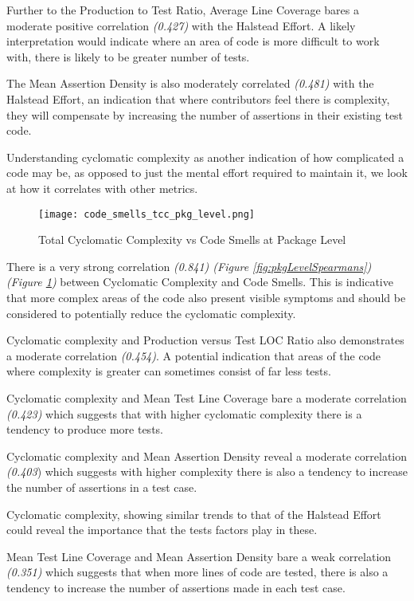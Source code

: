 Further to the Production to Test Ratio, Average Line Coverage bares a moderate positive correlation \textit{(0.427)} with the Halstead Effort. A likely interpretation would indicate where an area of code is more difficult to work with, there is likely to be greater number of tests.

The Mean Assertion Density is also moderately correlated \textit{(0.481)} with the Halstead Effort, an indication that where contributors feel there is complexity, they will compensate by increasing the number of assertions in their existing test code. 

Understanding cyclomatic complexity as another indication of how complicated a code may be, as opposed to just the mental effort required to maintain it, we look at how it correlates with other metrics.  

\begin{figure}[H]
	\texttt{[image: code\_smells\_tcc\_pkg\_level.png]}
	\caption{Total Cyclomatic Complexity vs Code Smells at Package Level}
	\label{fig:tccCodeSmellsPkg}  
\end{figure}

There is a very strong correlation \textit{(0.841) (Figure \ref{fig:pkgLevelSpearmans}) (Figure \ref{fig:tccCodeSmellsPkg})} between Cyclomatic Complexity and Code Smells. This is indicative that more complex areas of the code also present visible symptoms and should be considered to potentially reduce the cyclomatic complexity.  

Cyclomatic complexity and Production versus Test LOC Ratio also demonstrates a moderate correlation \textit{(0.454)}. A potential indication that areas of the code where complexity is greater can sometimes consist of far less tests.

Cyclomatic complexity and Mean Test Line Coverage bare a moderate correlation \textit{(0.423)} which suggests that with higher cyclomatic complexity there is a tendency to produce more tests. 

Cyclomatic complexity and Mean Assertion Density reveal a moderate correlation \textit{(0.403}) which suggests with higher complexity there is also a tendency to increase the number of assertions in a test case.

Cyclomatic complexity, showing similar trends to that of the Halstead Effort could reveal the importance that the tests factors play in these.

Mean Test Line Coverage and Mean Assertion Density bare a weak correlation \textit{(0.351)} which suggests that when more lines of code are tested, there is also a tendency to increase the number of assertions made in each test case.

